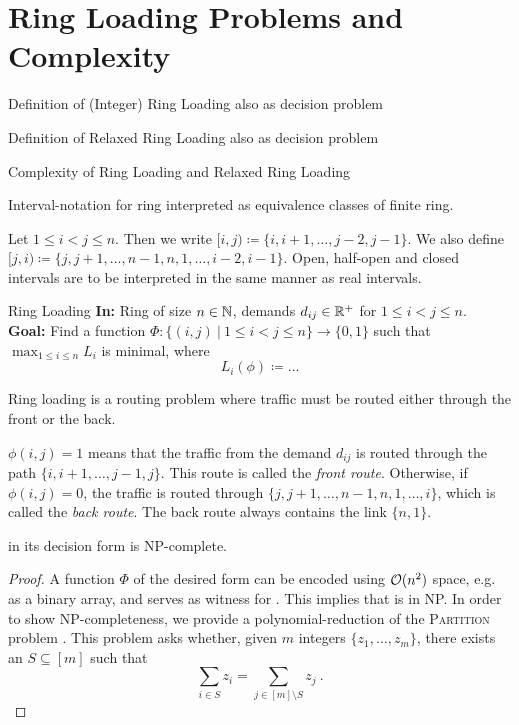 \section{Ring Loading Problems and Complexity}

Definition of (Integer) Ring Loading also as decision problem

Definition of Relaxed Ring Loading also as decision problem

Complexity of Ring Loading and Relaxed Ring Loading

Interval-notation for ring interpreted as equivalence classes of finite ring.

\begin{notation}
	Let $1 \leq i < j \leq n$.
	Then we write $[i, j) \coloneqq \{i, i+1, \ldots, j-2, j-1\}$.
	We also define $[j, i) \coloneqq \{j, j+1, \ldots, n-1, n, 1, \ldots, i-2, i-1\}$.
	Open, half-open and closed intervals are to be interpreted in the same manner as real intervals.
\end{notation}

\begin{problem}{Ring Loading}
	\textbf{In:} Ring of size $n \in \mathbb{N}$, demands $d_{ij} \in \mathbb{R}^+$ for $1 \leq i < j \leq n$.\\
	\textbf{Goal:} Find a function $\Phi: \{(i, j)~|~1 \leq i < j \leq n\} \rightarrow \{0, 1\}$ such that
	$\max_{1 \leq i \leq n} L_i$ is minimal, where
	\begin{equation}
		L_i(\phi) \coloneqq \ldots
	\end{equation}
\end{problem}
Ring loading is a routing problem where traffic must be routed either through the front or the back.

$\phi(i, j) = 1$ means that the traffic from the demand $d_{ij}$ is routed through the path $\{i, i+1, \ldots, j-1, j\}$.
This route is called the \emph{front route}.
Otherwise, if $\phi(i, j) = 0$, the traffic is routed through $\{j, j+1, \ldots, n-1, n, 1, \ldots, i\}$, which is called the \emph{back route}.
The back route always contains the link $\{n, 1\}$.

\begin{theorem}
	\RL in its decision form is NP-complete.
\end{theorem}
\begin{proof}
	A function $\Phi$ of the desired form can be encoded using $\mathcal{O}(n^2)$ space, e.g. as a binary array, and serves as witness for \RL.
	This implies that \RL is in NP.
	In order to show NP-completeness, we provide a polynomial-reduction of the \textsc{Partition} problem \cite{karp72}.
	This problem asks whether, given $m$ integers $\{z_1, \ldots, z_m\}$, there exists an $S \subseteq [m]$ such that 
	\begin{equation}
		\sum_{i \in S} z_i = \sum_{j \in [m] \setminus S} z_j \ .
	\end{equation}
	
\end{proof}

